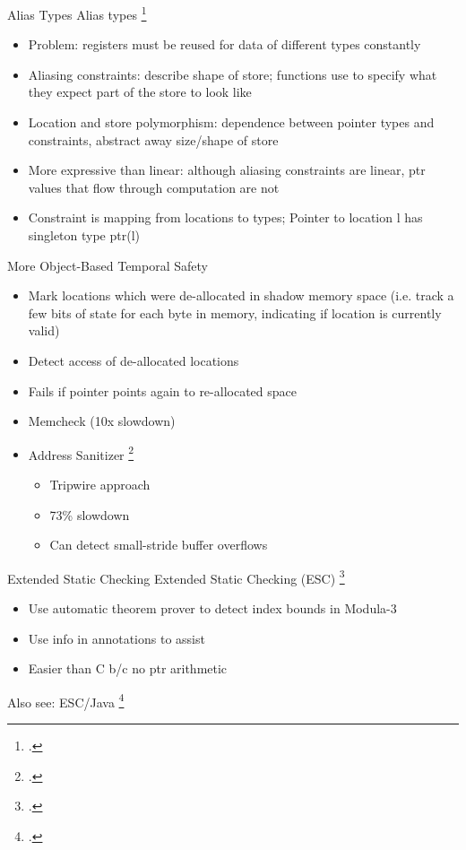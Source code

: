 \begin{frame}{Alias Types}
  Alias types \footcite{smith_alias_2000}
    \begin{itemize}
        \item Problem: registers must be reused for data of different types constantly
        \item Aliasing constraints: describe shape of store; functions use to specify what they expect part of the store to look like
        \item Location and store polymorphism: dependence between pointer types and constraints, abstract away size/shape of store
        \item More expressive than linear: although aliasing constraints are linear, ptr values that flow through computation are not
        \item Constraint is mapping from locations to types; Pointer to location l has singleton type ptr(l)
    \end{itemize}
\end{frame}

\begin{frame}{More Object-Based Temporal Safety}
\begin{itemize}
\item Mark locations which were de-allocated in shadow memory space (i.e. track a few bits of state for each byte in memory, indicating if location is currently valid)
\item Detect access of de-allocated locations
\item Fails if pointer points again to re-allocated space
\item Memcheck (10x slowdown)
\item Address Sanitizer \footcite{serebryany_addresssanitizer:_2012}
    \begin{itemize}
        \item Tripwire approach
        \item 73\% slowdown
        \item Can detect small-stride buffer overflows
    \end{itemize}
\end{itemize}
\end{frame}

\begin{frame}{Extended Static Checking}
Extended Static Checking (ESC) \footcite{detlefs_overview_1995}
    \begin{itemize}
      \item Use automatic theorem prover to detect index bounds in Modula-3
      \item Use info in annotations to assist
      \item Easier than C b/c no ptr arithmetic
    \end{itemize}
Also see: ESC/Java \footcite{flanagan_extended_2002}
\end{frame}

